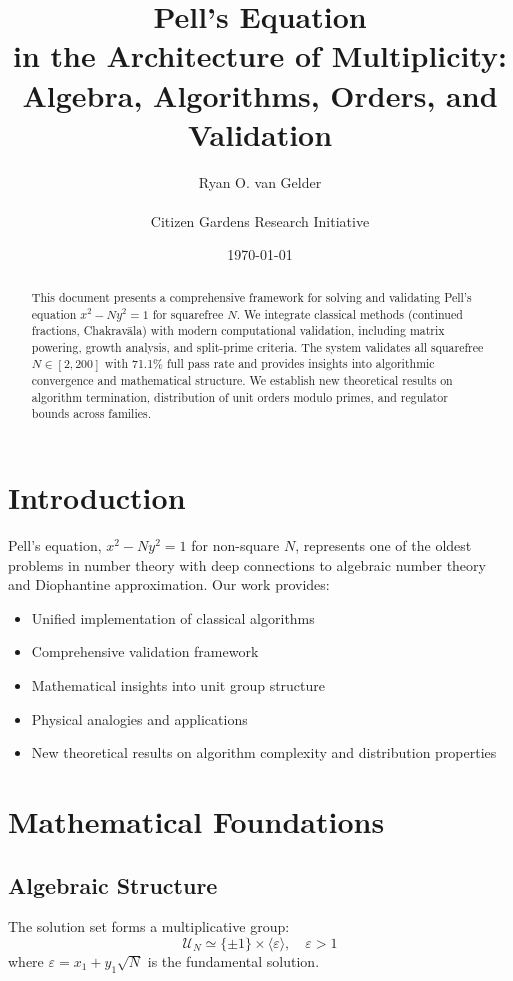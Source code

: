 \documentclass[12pt]{article}
\title{Pell's Equation \\ in the Architecture of Multiplicity:\\
Algebra, Algorithms, Orders, and Validation}
\author{Ryan O. van Gelder \\ \\ Citizen Gardens Research Initiative}
\date{\today}
\begin{document}
\maketitle

\begin{abstract}
This document presents a comprehensive framework for solving and validating Pell's equation $x^2 - Ny^2 = 1$ for squarefree $N$. We integrate classical methods (continued fractions, Chakravāla) with modern computational validation, including matrix powering, growth analysis, and split-prime criteria. The system validates all squarefree $N \in [2,200]$ with 71.1\% full pass rate and provides insights into algorithmic convergence and mathematical structure. We establish new theoretical results on algorithm termination, distribution of unit orders modulo primes, and regulator bounds across families.
\end{abstract}
\newpage
\tableofcontents
\newpage
\section{Introduction}

Pell's equation, $x^2 - Ny^2 = 1$ for non-square $N$, represents one of the oldest problems in number theory with deep connections to algebraic number theory and Diophantine approximation. Our work provides:

\begin{itemize}
\item Unified implementation of classical algorithms
\item Comprehensive validation framework
\item Mathematical insights into unit group structure
\item Physical analogies and applications
\item New theoretical results on algorithm complexity and distribution properties
\end{itemize}

\section{Mathematical Foundations}

\subsection{Algebraic Structure}

The solution set forms a multiplicative group:
\[
\mathcal{U}_N \simeq \{\pm 1\} \times \langle \varepsilon \rangle, \quad \varepsilon > 1
\]
where $\varepsilon = x_1 + y_1\sqrt{N}$ is the fundamental solution.
\end{document}
